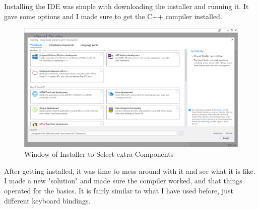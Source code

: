 \documentclass[12pt]{article}
\begin{document}
Installing the IDE was simple with downloading the installer and running it.
It gave some options and I made sure to get the C++ compiler installed.

\begin{figure}[ht]
	\centering
	\includegraphics[width=\textwidth]{vs_installer.png}
	\caption{Window of Installer to Select extra Components}
	\label{fig:vs_installer}
\end{figure}

After getting installed, it was time to mess around with it and see what it is like.
I made a new "solution" and made sure the compiler worked, and that things operated for the basics.
It is fairly similar to what I have used before, just different keyboard bindings.
\end{document}
